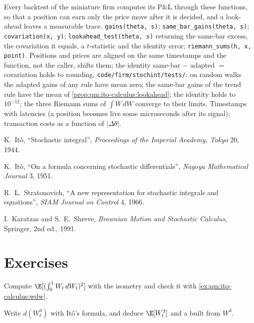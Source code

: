 \begin{build}
 Every backtest of the miniature firm computes its P\&L through these functions,
so that a position can earn only the price move after it is decided, and a look-ahead leaves a
measurable trace.
 \texttt{gains(theta, s)}; \texttt{same\_bar\_gains(theta, s)};
\texttt{covariation(x, y)}; \texttt{lookahead\_test(theta, s)} returning the same-bar excess, the
covariation it equals, a $t$-statistic and the identity error; \texttt{riemann\_sums(h, x,
point)}.
 Positions and prices are aligned on the same timestamps and the function, not
the caller, shifts them; the identity same-bar $-$ adapted $=$ covariation holds to rounding.
 \texttt{code/firm/stochint/tests/}: on random walks the adapted gains of
any rule have mean zero; the same-bar gains of the trend rule have the mean of
\cref{prop:qm:ito-calculus:lookahead}; the identity holds to $10^{-12}$; the three Riemann sums of
$\int W\,dW$ converge to their limits.
 Timestamps with latencies (a position becomes live some microseconds after its
signal); transaction costs as a function of $|\Delta\theta|$.
\end{build}

\begin{omsources}
\item K.~Itô, ``Stochastic integral'', \emph{Proceedings of the Imperial Academy, Tokyo} 20, 1944.
\item K.~Itô, ``On a formula concerning stochastic differentials'', \emph{Nagoya Mathematical
Journal} 3, 1951.
\item R.~L.~Stratonovich, ``A new representation for stochastic integrals and equations'',
\emph{SIAM Journal on Control} 4, 1966.
\item I.~Karatzas and S.~E.~Shreve, \emph{Brownian Motion and Stochastic Calculus}, Springer,
2nd ed., 1991.
\end{omsources}

\section{Exercises}

\begin{exercise}[$\star$]\label{exo:qm:ito-calculus:1}
Compute $\E[(\int_0^1W_t\,dW_t)^2]$ with the isometry and check it with \cref{ex:qm:ito-calculus:wdw}.
\end{exercise}

\begin{exercise}[$\star$]\label{exo:qm:ito-calculus:2}
Write $d(W_t^3)$ with Itô's formula, and deduce $\E[W_t^3]$ and a  built from $W^3$.
\end{exercise}

